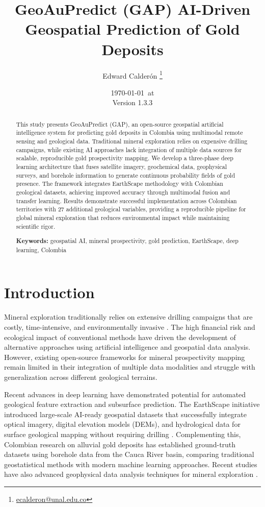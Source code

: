 \documentclass[12pt,a4paper]{article}
\title{GeoAuPredict (GAP) AI-Driven Geospatial Prediction of Gold Deposits}
\author{Edward Calderón \thanks{\href{mailto:ecalderon@unal.edu.co}{ecalderon@unal.edu.co}}}
\affil{Universidad Nacional de Colombia}
\date{\today\ at \currenttime \\ {\small Version 1.3.3}}
\begin{document}
\maketitle

\begin{abstract}
This study presents GeoAuPredict (GAP), an open-source geospatial artificial intelligence system for predicting gold deposits in Colombia using multimodal remote sensing and geological data. Traditional mineral exploration relies on expensive drilling campaigns, while existing AI approaches lack integration of multiple data sources for scalable, reproducible gold prospectivity mapping. We develop a three-phase deep learning architecture that fuses satellite imagery, geochemical data, geophysical surveys, and borehole information to generate continuous probability fields of gold presence. The framework integrates EarthScape methodology with Colombian geological datasets, achieving improved accuracy through multimodal fusion and transfer learning. Results demonstrate successful implementation across Colombian territories with 27 additional geological variables, providing a reproducible pipeline for global mineral exploration that reduces environmental impact while maintaining scientific rigor.

\textbf{Keywords:} geospatial AI, mineral prospectivity, gold prediction, EarthScape, deep learning, Colombia
\end{abstract}

\section{Introduction}

Mineral exploration traditionally relies on extensive drilling campaigns that are costly, time-intensive, and environmentally invasive \citep{traditional_exploration}. The high financial risk and ecological impact of conventional methods have driven the development of alternative approaches using artificial intelligence and geospatial data analysis. However, existing open-source frameworks for mineral prospectivity mapping remain limited in their integration of multiple data modalities and struggle with generalization across different geological terrains.

Recent advances in deep learning have demonstrated potential for automated geological feature extraction and subsurface prediction. The EarthScape initiative introduced large-scale AI-ready geospatial datasets that successfully integrate optical imagery, digital elevation models (DEMs), and hydrological data for surface geological mapping without requiring drilling \citep{massey2025earthscape}. Complementing this, Colombian research on alluvial gold deposits has established ground-truth datasets using borehole data from the Cauca River basin, comparing traditional geostatistical methods with modern machine learning approaches. Recent studies have also advanced geophysical data analysis techniques for mineral exploration \citep{springer2025}.
\end{document}
